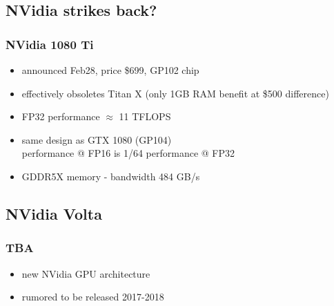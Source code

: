 \documentclass{beamer}
\begin{document}
        \subsection{NVidia strikes back?}
            \begin{frame}
                \frametitle{NVidia 1080 Ti}
                    \begin{itemize}
                        \item announced Feb28, price \$699, GP102 chip
                        \item effectively obsoletes Titan X (only 1GB RAM benefit at \$500 difference)
                        \item FP32 performance $\approx$ 11 TFLOPS
                        \item same design as GTX 1080 (GP104)\\
                            performance @ FP16 is 1/64 performance @ FP32
                        \item GDDR5X memory - bandwidth 484 GB/s
                    \end{itemize}
            \end{frame}
            
	\subsection{NVidia Volta}
        \begin{frame}
            \frametitle{TBA}
                \begin{itemize}
                    \item new NVidia GPU architecture
                    \item rumored to be released 2017-2018
                \end{itemize}
        \end{frame}
\end{document}
